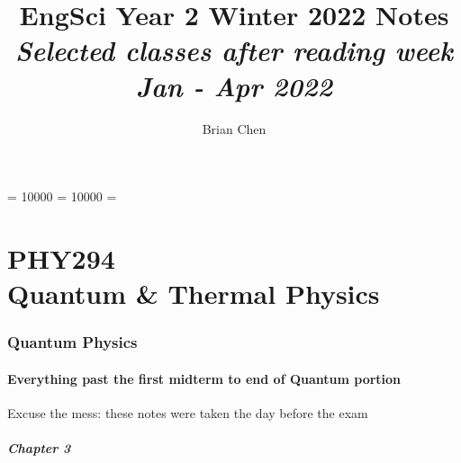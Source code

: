 \documentclass[10pt]{article}
\begin{document}
\hbadness= 10000
\vbadness= 10000
\hfuzz=\maxdimen {}

\title{{EngSci Year 2 Winter 2022 Notes}\\{\normalsize{\itshape Selected classes after reading week\\Jan - Apr 2022}}}
\author{Brian Chen}
\maketitle
\newpage
\pagestyle{fancynotes}

\part{PHY294\texorpdfstring{\\}/ Quantum \& Thermal Physics}
\section{Quantum Physics}

\subsection{Everything past the first midterm to end of Quantum portion}
\begin{blockquote}
	Excuse the mess: these notes were taken the day before the exam
\end{blockquote}


\subsubsection{Chapter 3}
\end{document}
